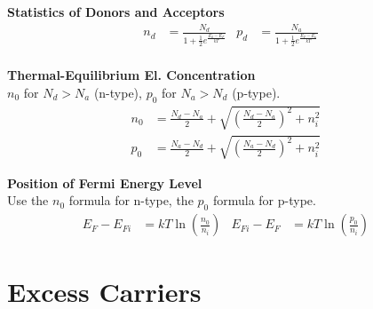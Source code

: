 \documentclass[a4paper, fontsize=8pt, landscape, DIV=1]{scrartcl}
\begin{document}
\begin{multicols*}{4}
    \textbf{Statistics of Donors and Acceptors} \\
      \begin{align*}
        n_d &= \frac{N_d}{1+\frac{1}{2}e^{\frac{E_d-E_F}{kT}}} &
        p_d &= \frac{N_a}{1+\frac{1}{2}e^{\frac{E_F-E_a}{kT}}} \\
      \end{align*}

    \textbf{Thermal-Equilibrium El. Concentration} \\
    $n_0$ for $N_d>N_a$ (n-type), $p_0$ for $N_a>N_d$ (p-type).
      \begin{align*}
        n_0 & = \frac{N_d-N_a}{2}+\sqrt{\left(\frac{N_d-N_a}{2}\right)^2+n_i^2} \\
        p_0 & = \frac{N_a-N_d}{2}+\sqrt{\left(\frac{N_a-N_d}{2}\right)^2+n_i^2} &
      \end{align*}
 
    \textbf{Position of Fermi Energy Level} \\
    Use the $n_0$ formula for n-type, the $p_0$ formula for p-type.
      \begin{align*}
        E_F-E_{Fi} &= kT\ln\left(\frac{n_0}{n_i}\right) &
        E_{Fi}-E_{F} &= kT\ln\left(\frac{p_0}{n_i}\right) &
      \end{align*}

  \section{Excess Carriers}


\end{multicols*}
\end{document}
